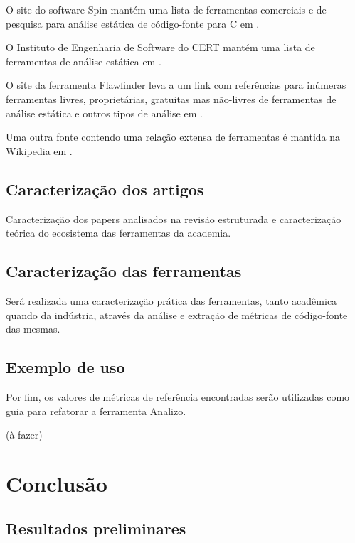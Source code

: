 \documentclass[12pt]{article}
\begin{document}
O site do software Spin mantém uma lista de ferramentas comerciais e de
pesquisa para análise estática de código-fonte para C em
.

O Instituto de Engenharia de Software do CERT mantém uma lista de ferramentas
de análise estática em .

O site da ferramenta Flawfinder leva a um link com referências para inúmeras
ferramentas livres, proprietárias, gratuitas mas não-livres de ferramentas de
análise estática e outros tipos de análise em
.

Uma outra fonte contendo uma relação extensa de ferramentas é mantida na
Wikipedia em .

\subsection{Caracterização dos artigos}

Caracterização dos papers analisados na revisão estruturada e caracterização
teórica do ecosistema das ferramentas da academia.

\subsection{Caracterização das ferramentas}

Será realizada uma caracterização prática das ferramentas, tanto acadêmica
quando da indústria, através da análise e extração de métricas de código-fonte
das mesmas.


\subsection{Exemplo de uso}

Por fim, os valores de métricas de referência encontradas serão utilizadas
como guia para refatorar a ferramenta Analizo.

(à fazer)

\section{Conclusão}

\subsection{Resultados preliminares}\label{resultados}
\end{document}
